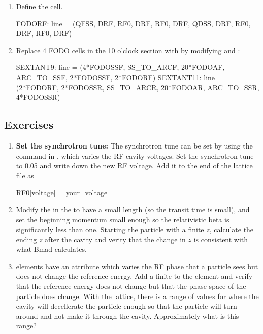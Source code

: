 \documentclass{hitec}     %
\begin{document}
{\begin{enumerate}[leftmargin=*]
    \item Define the  cell.
    \begin{code}
FODORF: line = (QFSS, DRF, RF0, DRF, RF0, DRF, QDSS, DRF, RF0, DRF, RF0, DRF)
    \end{code}
    
    \item Replace 4 FODO cells in the 10 o'clock section with  by modifying  and :
    \begin{code}
SEXTANT9:  line = (4*FODOSSF, SS_TO_ARCF, 20*FODOAF, 
                              ARC_TO_SSF, 2*FODOSSF, 2*FODORF)
SEXTANT11: line = (2*FODORF, 2*FODOSSR, SS_TO_ARCR, 
                        20*FODOAR, ARC_TO_SSR, 4*FODOSSR)
    \end{code}
\end{enumerate}

\subsection{Exercises}

\begin{enumerate}[leftmargin=*]
%
\item {\bf Set the synchrotron tune:} The synchrotron tune can be set by using the  command in \tao, which varies the RF cavity voltages. Set the synchrotron tune to 0.05 and write down the new RF voltage. Add it to the end of the lattice file as
\begin{code}
RF0[voltage] = your_voltage
\end{code}
%
\item 
Modify the  in the  to have a small length (so the transit time is
small), and set the beginning momentum small enough so the relativistic beta is significantly less than
one. Starting the particle with a finite $z$, calculate the ending $z$ after the cavity and verity
that the change in $z$ is consistent with what Bmad calculates.
%
\item
{} elements have an attribute  which varies the RF phase that a particle sees
but does not change the reference energy. Add a finite  to the  element and
verify that the reference energy does not change but that the phase space  of the particle
does change. 
 With the  lattice, there is a range of values for  where the
cavity will decellerate the particle enough so that the particle will turn around and not make
it through the cavity. Approximately what is this range?
%
\end{enumerate}

}
\end{document}
